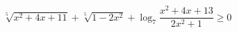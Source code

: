 \begin{ex}[type=inequality]
	\begin{condition}
		\( \sqrt[5]{x^2+4x+11}+\sqrt[5]{1-2x^2}+\log_7{\dfrac{x^2+4x+13}{2x^2+1}}\ge0 \)
	\end{condition}
\end{ex}